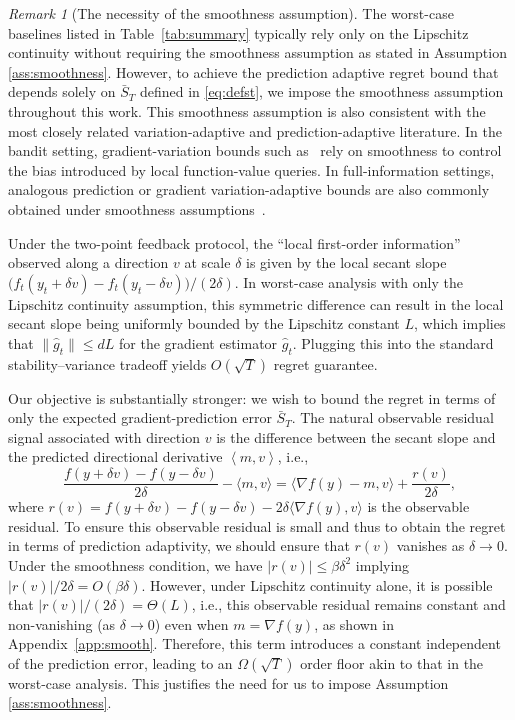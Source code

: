\documentclass[journal,onecolumn]{IEEEtran}
\theoremstyle{plain}
\theoremstyle{definition}
\theoremstyle{remark}
\newtheorem{remark}[theorem]{Remark}
\newcommand{\inner}[2]{\left\langle #1, #2 \right\rangle}
\begin{document}
\begin{remark}[The necessity of the smoothness assumption]
The worst-case baselines listed in Table~\ref{tab:summary} typically rely only on the Lipschitz continuity without requiring the smoothness assumption as stated in Assumption \ref{ass:smoothness}. However, to achieve the prediction adaptive regret bound that depends solely on $\bar S_T$ defined in \eqref{eq:defst}, we impose the smoothness assumption throughout this work. This smoothness assumption is also consistent with the most closely related
variation-adaptive and prediction-adaptive literature. In the bandit
setting, gradient-variation bounds such as~\cite{chiang2013beating,yu2026improved} rely on smoothness to control the
bias introduced by local function-value queries. In full-information
settings, analogous prediction or gradient variation-adaptive bounds are also commonly obtained under smoothness assumptions~\cite{zhang2018adaptive,zhao2024adaptivity,sachs2023accelerated}.

Under the two-point feedback protocol, the ``local first-order information'' observed along a direction $v$ at scale $\delta$ is given by the local secant slope $\big(f_t(y_t+\delta v)-f_t(y_t-\delta v)\big)/(2\delta)$. In worst-case analysis with only the Lipschitz continuity assumption, this symmetric difference can result in the local secant slope being uniformly bounded by the Lipschitz constant $L$, which implies that $\|\hat{g}_t\|\leq dL$ for the gradient estimator $\hat{g}_t$. Plugging this into the standard stability–variance tradeoff yields $O(\sqrt{T})$ regret guarantee.

Our objective is substantially stronger: we wish to bound the regret in terms of only the expected gradient-prediction error $\bar S_T$. The natural observable residual signal associated with  direction $v$ is the difference between the secant slope and the predicted directional derivative $\inner{m}{v}$, i.e.,
\begin{equation*}
    \frac{f(y + \delta v)-f(y-\delta v)}{2\delta} - \langle m, v\rangle=\langle \nabla f(y)-m, v\rangle + \frac{r(v)}{2\delta},
\end{equation*}
where $r(v)=f(y+\delta v)-f(y-\delta v)-2\delta\langle \nabla f(y),v\rangle$ is the observable residual. To ensure this observable residual is small and thus to obtain the regret in terms of prediction adaptivity, we should ensure that $r(v)$ vanishes as $\delta\to 0$. Under the smoothness condition, we have $|r(v)|\leq \beta\delta^2$ implying $|r(v)|/2\delta=O(\beta\delta)$. However, under Lipschitz continuity alone, it is possible that $|r(v)|/(2\delta)=\Theta(L)$, i.e., this observable residual remains constant  and non-vanishing (as $\delta\to0$) even when $m=\nabla f(y)$, as shown in Appendix~\ref{app:smooth}. Therefore, this term introduces a constant independent of  the prediction error, leading to an  $\Omega(\sqrt{T})$ order floor akin to that in the worst-case analysis.  This justifies the need for us to impose Assumption \ref{ass:smoothness}.
\end{remark}
\end{document}
